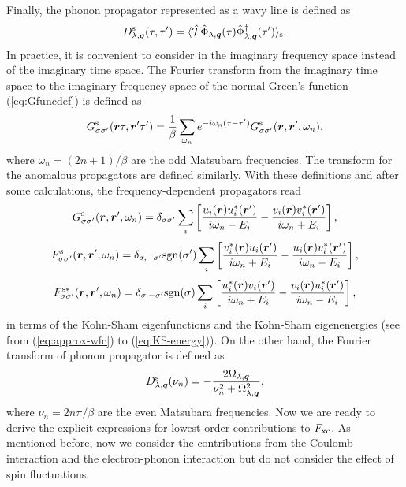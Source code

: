 %
Finally, the phonon propagator represented as a wavy line is defined as 
%
\begin{equation}
	D^{\rm s}_{\lambda,{\bm q}}(\tau,\tau') = \langle \hat{\mathcal T}
	\hat{\Phi}_{\lambda, {\bm q}}(\tau)\hat{\Phi}^\dag_{\lambda, {\bm q}}(\tau')
	\rangle_{\rm s}.
	\label{eq:ph-prop}
\end{equation}
%
In practice, it is convenient to consider in the imaginary frequency space instead of the imaginary time space.
The Fourier transform from the imaginary time space to the imaginary frequency space 
of the normal Green's function (\ref{eq:Gfuncdef}) is defined as
%
\begin{equation}
	G^{\rm s}_{\sigma\sigma'}({\bm r}\tau,{\bm r'}\tau') = \frac{1}{\beta}
	\sum_{\omega_n}e^{-i\omega_n(\tau-\tau')}G^{\rm s}_{\sigma\sigma'}({\bm r},{\bm r'},\omega_n)
	,
	\label{eq:Fouriertrans}
\end{equation}
%
where $\omega_n=(2n+1)/\beta$ are the odd Matsubara frequencies. 
The transform for the anomalous propagators are defined similarly. 
With these definitions and after some calculations, the frequency-dependent propagators read
%
\begin{equation}
	G^{\rm s}_{\sigma\sigma'}({\bm r},{\bm r'},\omega_n) = \delta_{\sigma\sigma'}
	\sum_{i}
	\left[
		\frac{u_i(\bm r)u^\ast_i(\bm r')}{i\omega_n-E_i} - 
		\frac{v_i(\bm r)v^\ast_i(\bm r')}{i\omega_n+E_i}
	\right],
	\label{eq:Gfreq}
\end{equation}
%
\begin{equation}
	F^{\rm s}_{\sigma\sigma'}({\bm r},{\bm r'},\omega_n) = \delta_{\sigma,-\sigma'}{\rm sgn}(\sigma')
	\sum_{i}
	\left[
		\frac{v^\ast_i(\bm r)u_i(\bm r')}{i\omega_n+E_i} - 
		\frac{u_i(\bm r)v^\ast_i(\bm r')}{i\omega_n-E_i}
	\right],
	\label{eq:Ffreq}
\end{equation}
%
\begin{equation}
	F^{\rm s\ast}_{\sigma\sigma'}({\bm r},{\bm r'},\omega_n) = \delta_{\sigma,-\sigma'}{\rm sgn}(\sigma)
	\sum_{i}
	\left[
		\frac{u^\ast_i(\bm r)v_i(\bm r')}{i\omega_n+E_i} - 
		\frac{v_i(\bm r)u^\ast_i(\bm r')}{i\omega_n-E_i}
	\right],
	\label{eq:Fdagfreq}
\end{equation}
%
in terms of the Kohn-Sham eigenfunctions and the Kohn-Sham eigenenergies 
(see from (\ref{eq:approx-wfc}) to (\ref{eq:KS-energy})).
On the other hand, the Fourier transform of phonon propagator is defined as
%
\begin{equation}
	D^{\rm s}_{\lambda, \bm q}(\nu_n) = - \frac{2\Omega_{\lambda, \bm q}}
	{\nu^2_n + \Omega^2_{\lambda, \bm q}},
	\label{eq:phtrans}
\end{equation}
%
where $\nu_n = 2n\pi/\beta$ are the even Matsubara frequencies.
Now we are ready to derive the explicit expressions for lowest-order contributions to $F_{\rm xc}$.
As mentioned before, now we consider the contributions from the Coulomb interaction and the electron-phonon interaction
but do not consider the effect of spin fluctuations.

